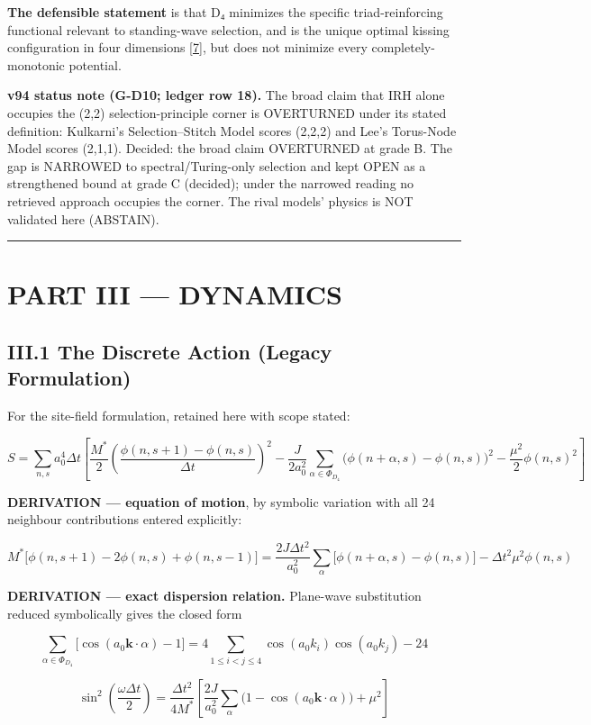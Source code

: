 \documentclass[a4paper,11pt]{article}
\begin{document}
\textbf{The defensible statement} is that D₄ minimizes the specific triad-reinforcing functional relevant to standing-wave selection, and is the unique optimal kissing configuration in four dimensions \hyperref[ref7]{[7]}, but does not minimize every completely-monotonic potential.

\textbf{v94 status note (G-D10; ledger row 18).} The broad claim that IRH alone occupies the (2,2) selection-principle corner is OVERTURNED under its stated definition: Kulkarni's Selection--Stitch Model scores (2,2,2) and Lee's Torus-Node Model scores (2,1,1). Decided: the broad claim OVERTURNED at grade B. The gap is NARROWED to spectral/Turing-only selection and kept OPEN as a strengthened bound at grade C (decided); under the narrowed reading no retrieved approach occupies the corner. The rival models' physics is NOT validated here (ABSTAIN).

\medskip\hrule\medskip

\section*{PART III — DYNAMICS}

\subsection*{III.1 The Discrete Action (Legacy Formulation)}

For the site-field formulation, retained here with scope stated:

\[S=\sum_{n,s}a_0^4\Delta t\left[\frac{M^{*}}{2}\left(\frac{\phi(n,s{+}1)-\phi(n,s)}{\Delta t}\right)^2-\frac{J}{2a_0^2}\sum_{\alpha\in\Phi_{D_4}}\big(\phi(n{+}\alpha,s)-\phi(n,s)\big)^2-\frac{\mu^2}{2}\phi(n,s)^2\right]\]

\textbf{DERIVATION — equation of motion}, by symbolic variation with all 24 neighbour contributions entered explicitly:

\[M^{*}\big[\phi(n,s{+}1)-2\phi(n,s)+\phi(n,s{-}1)\big]=\frac{2J\Delta t^2}{a_0^2}\sum_{\alpha}\big[\phi(n{+}\alpha,s)-\phi(n,s)\big]-\Delta t^2\mu^2\phi(n,s)\]

\textbf{DERIVATION — exact dispersion relation.} Plane-wave substitution reduced symbolically gives the closed form

\[\sum_{\alpha\in\Phi_{D_4}}\big[\cos(a_0\mathbf k\cdot\alpha)-1\big]=4\!\!\sum_{1\le i<j\le4}\!\!\cos(a_0k_i)\cos(a_0k_j)-24\]

\[\sin^2\!\left(\frac{\omega\Delta t}{2}\right)=\frac{\Delta t^2}{4M^{*}}\left[\frac{2J}{a_0^2}\sum_{\alpha}\big(1-\cos(a_0\mathbf k\cdot\alpha)\big)+\mu^2\right]\]
\end{document}
